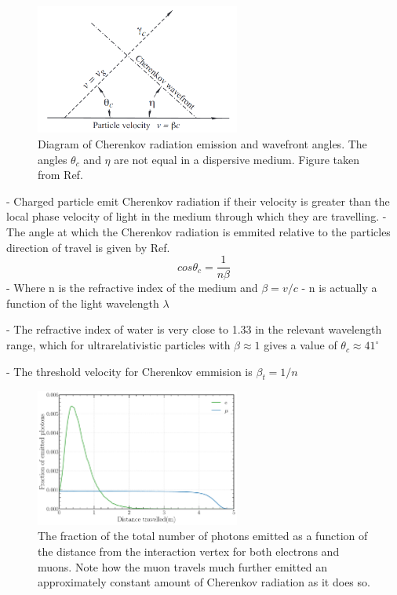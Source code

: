 \begin{figure} %
    \includegraphics[width=0.6\textwidth]{diagrams/4-exp/cherenkov.png}
    \caption[Diagram of Cherenkov radiation.]
    {Diagram of Cherenkov radiation emission and wavefront angles. The angles $\theta_{c}$ and
        $\eta$ are not equal in a dispersive medium. Figure taken from Ref.~\cite{particle2020}
    }
    \label{fig:cherenkov}
\end{figure}

- Charged particle emit Cherenkov radiation if their velocity is greater than the local phase
velocity of light in the medium through which they are travelling.
- The angle at which the Cherenkov radiation is emmited relative to the particles direction of
travel is given by Ref.~\cite{particle2020}
\begin{equation}
    cos\theta_{c} = \frac{1}{n\beta}
\end{equation}
- Where n is the refractive index of the medium and $\beta=v/c$
- n is actually a function of the light wavelength $\lambda$

- The refractive index of water is very close to 1.33 in the relevant wavelength range, which for
ultrarelativistic particles with $\beta\approx 1$ gives a value of $\theta_{c}\approx 41^{\circ}$

- The threshold velocity for Cherenkov emmision is $\beta_{t}=1/n$

\begin{figure} %
    \includegraphics[width=0.6\textwidth]{diagrams/4-exp/emission_distance.pdf}
    \caption[Fraction of Cherenkov photons emitted as a function of distance.]
    {The fraction of the total number of photons emitted as a function of the distance from the
        interaction vertex for both electrons and muons. Note how the muon travels much further
        emitted an approximately constant amount of Cherenkov radiation as it does so.}
    \label{fig:emission distance}
\end{figure}

